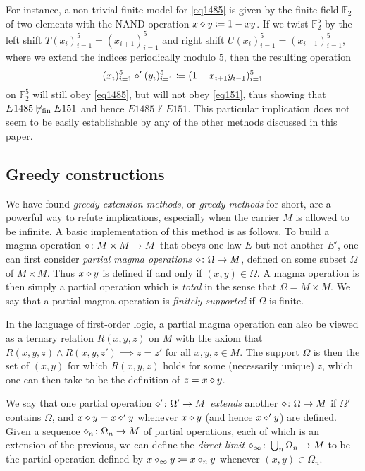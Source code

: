 For instance, a non-trivial finite model for \eqref{eq1485} is given by the finite field $\mathbb{F}_2$ of two elements with the NAND operation $x \diamond y \coloneqq 1-xy$.  If we twist $\mathbb{F}_2^5$ by the left shift $T(x_i)_{i=1}^5 = (x_{i+1})_{i=1}^5$ and right shift $U(x_i)_{i=1}^5 = (x_{i-1})_{i=1}^5$, where we extend the indices periodically modulo $5$, then the resulting operation
$$ (x_i)_{i=1}^5 \diamond' (y_i)_{i=1}^5 \coloneqq (1 - x_{i+1} y_{i-1})_{i=1}^5$$
on $\mathbb{F}_2^5$ will still obey \eqref{eq1485}, but will not obey \eqref{eq151}, thus showing that $E1485 \not \vdash_{\mathrm{fin}} E151$ and hence $E1485 \not \vdash E151$.  This particular implication does not seem to be easily establishable by any of the other methods discussed in this paper.



\subsection{Greedy constructions}\label{greedy-sec}

We have found \emph{greedy extension methods}, or \emph{greedy methods} for short, are a powerful way to refute implications, especially when the carrier $M$ is allowed to be infinite.  A basic implementation of this method is as follows.  To build a magma operation $\diamond \colon M \times M \to M$ that obeys one law $E$ but not another $E'$, one can first consider \emph{partial magma operations} $\diamond \colon \Omega \to M$, defined on some subset $\Omega$ of $M \times M$. Thus $x \diamond y$ is defined if and only if $(x,y) \in \Omega$. A magma operation is then simply a partial operation which is \emph{total} in the sense that $\Omega = M \times M$.  We say that a partial magma operation is \emph{finitely supported} if $\Omega$ is finite.

In the language of first-order logic, a partial magma operation can also be viewed as a ternary relation $R(x,y,z)$ on $M$ with the axiom that $R(x,y,z) \wedge R(x,y,z') \implies z=z'$ for all $x,y,z \in M$.  The support $\Omega$ is then the set of $(x,y)$ for which $R(x,y,z)$ holds for some (necessarily unique) $z$, which one can then take to be the definition of $z = x \diamond y$.

We say that one partial operation $\diamond' \colon \Omega' \to M$ \emph{extends} another $\diamond \colon \Omega \to M$ if $\Omega'$ contains $\Omega$, and $x \diamond y = x \diamond' y$ whenever $x \diamond y$ (and hence $x \diamond' y$) are defined. Given a sequence $\diamond_n \colon \Omega_n \to M$ of partial operations, each of which is an extension of the previous, we can define the \emph{direct limit} $\diamond_\infty \colon \bigcup_n \Omega_n \to M$ to be the partial operation defined by $x \diamond_\infty y \coloneqq x \diamond_n y$ whenever $(x,y) \in \Omega_n$.

